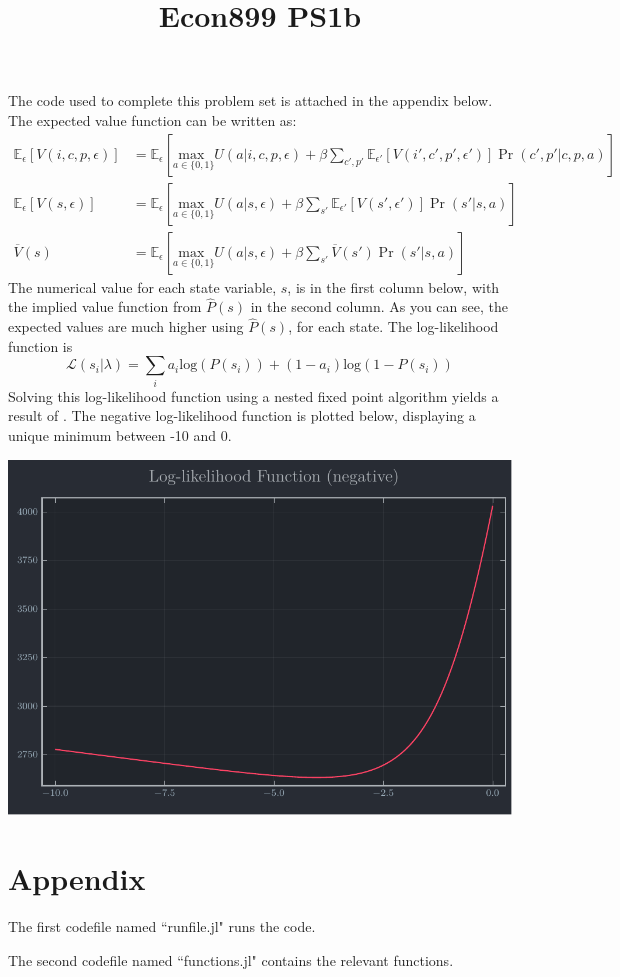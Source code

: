 \documentclass[landscape]{article} %
\title{Econ899 PS1b}
\newcommand{\Ee}[1]{\mathbb{E}_{\epsilon}\left[#1\right]}
\newcommand{\Eep}[1]{\mathbb{E}_{\epsilon'}\left[#1\right]}
\renewcommand{\L}{\mathcal{L}}
\newcommand{\usmax}[1]{\underset{#1}{\text{max }}}
\newcommand{\loge}[1]{\text{log}\left(#1\right)}
\theoremstyle{definition}
\begin{document}
The code used to complete this problem set is attached in the appendix below. \bigskip \\
The expected value function can be written as:\begin{align*}
	\Ee{V(i, c, p, \epsilon)} &= \Ee{\usmax{a\in\{0, 1\}} U(a|i,c,p,\epsilon) + \beta\sum_{c',p'}\Eep{V(i',c',p',\epsilon')}\Pr(c',p'|c,p,a)} \\
	\Ee{V(s, \epsilon)} &= \Ee{\usmax{a\in\{0, 1\}} U(a|s,\epsilon) + \beta\sum_{s'}\Eep{V(s', \epsilon')}\Pr(s'|s,a)} \\
	\overline{V}(s) &= \Ee{\usmax{a\in\{0, 1\}} U(a|s,\epsilon) + \beta\sum_{s'}\overline{V}(s')\Pr(s'|s,a)} 
\end{align*}
The numerical value for each state variable, $s$, is in the first column below, with the implied value function from $\hat{P}(s)$ in the second column. As you can see, the expected values are much higher using $\hat{P}(s)$, for each state. 
\newpage
The log-likelihood function is \[
	\L(s_i|\lambda) = \sum_ia_i\loge{P(s_i)} + (1-a_i)\loge{1 - P(s_i)}
\]
Solving this log-likelihood function using a nested fixed point algorithm yields a result of . The negative log-likelihood function is plotted below, displaying a unique minimum between -10 and 0.
\begin{center}
	\includegraphics[width = \textwidth]{figures/Problem4.pdf}
\end{center}

\newpage
\section*{Appendix}
 	The first codefile named ``runfile.jl" runs the code.
	
 	The second codefile named ``functions.jl" contains the relevant functions.
\end{document}
